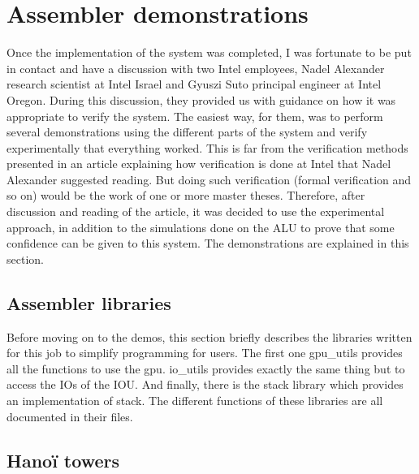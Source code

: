 \section{Assembler demonstrations}

Once the implementation of the system was completed, I was fortunate to be put in contact and have 
a discussion with two Intel employees, Nadel Alexander research scientist at Intel Israel and 
Gyuszi Suto principal engineer at Intel Oregon. During this discussion, they provided us with 
guidance on how it was appropriate to verify the system. The easiest way, for them, was to perform 
several demonstrations using the different parts of the system and verify experimentally that 
everything worked. This is far from the verification methods presented in an article 
explaining how verification is done at Intel that Nadel Alexander suggested reading. But doing such 
verification (formal verification and so on) would be the work of one or more master theses. 
Therefore, after discussion and reading of the article, it was decided to use the experimental 
approach, in addition to the simulations done on the ALU to prove that some confidence can be given 
to this system. The demonstrations are explained in this section.

\subsection{Assembler libraries}

Before moving on to the demos, this section briefly describes the libraries written for this job to 
simplify programming for users. The first one gpu\_utils provides all the functions to use the gpu. 
io\_utils provides exactly the same thing but to access the IOs of the IOU. And finally, there is 
the stack library which provides an implementation of stack. The different functions of these 
libraries are all documented in their files.

\subsection{Hanoï towers}


